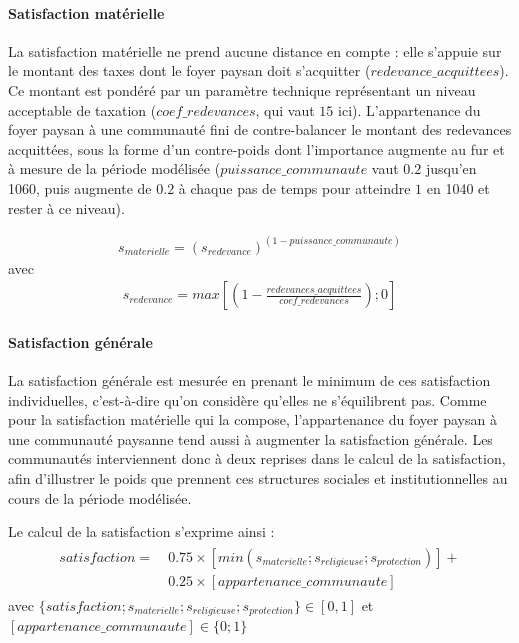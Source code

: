 \paragraph{Satisfaction matérielle}

La satisfaction matérielle ne prend aucune distance en compte : elle s'appuie sur le montant des taxes dont le foyer paysan doit s'acquitter ($redevance\_acquittees$).
Ce montant est pondéré par un paramètre technique représentant un niveau \og acceptable\fg{} de taxation ($coef\_redevances$, qui vaut $15$ ici).
L'appartenance du foyer paysan à une communauté fini de contre-balancer le montant des redevances acquittées, sous la forme d'un contre-poids dont l'importance augmente au fur et à mesure de la période modélisée ($puissance\_communaute$ vaut $0.2$ jusqu'en 1060, puis augmente de $0.2$ à chaque pas de temps pour atteindre $1$ en 1040 et rester à ce niveau).

\begin{equation*}
\begin{gathered}
s_{materielle} = (s_{redevance})^{(1-puissance\_communaute)}
\end{gathered}
\end{equation*}
avec 
\begin{equation*}
\begin{gathered}
s_{redevance} = max \left[ \left( 1- \frac{redevances\_acquittees}{coef\_redevances} \right) ; 0 \right]
\end{gathered}
\end{equation*}

\paragraph{Satisfaction générale}

La satisfaction générale est mesurée en prenant le minimum de ces satisfaction individuelles, c'est-à-dire qu'on considère qu'elles ne s'équilibrent pas.
Comme pour la satisfaction matérielle qui la compose, l'appartenance du foyer paysan à une communauté paysanne tend aussi à augmenter la satisfaction générale.
Les communautés interviennent donc à deux reprises dans le calcul de la satisfaction, afin d'illustrer le poids que prennent ces structures sociales et institutionnelles au cours de la période modélisée.

Le calcul de la satisfaction s'exprime ainsi :
\begin{equation*}
\begin{gathered}
\begin{split}
satisfaction =~& 0.75 \times \left[ min \left( s_{materielle} ; s_ {religieuse}; s_{protection} \right) \right] + \\
& 0.25 \times [appartenance\_communaute]
\end{split}
\end{gathered}
\end{equation*}
avec $ \{satisfaction ; s_{materielle} ; s_ {religieuse} ; s_{protection}\} \in [0,1]$ et $[appartenance\_communaute] \in \{0;1\} $



